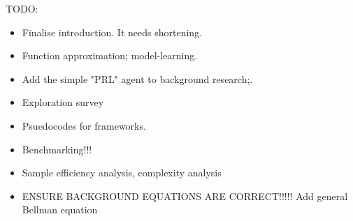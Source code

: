 TODO:
\begin{itemize}
    \item Finalise introduction. It needs shortening.
    \item Function approximation; model-learning.
    \item Add the simple "PRL" agent to background research;.
    \item Exploration survey
    \item Psuedocodes for frameworks.
    \item Benchmarking!!!
    \item Sample efficiency analysis, complexity analysis
    \item ENSURE BACKGROUND EQUATIONS ARE CORRECT!!!!! Add general Bellman equation
\end{itemize}